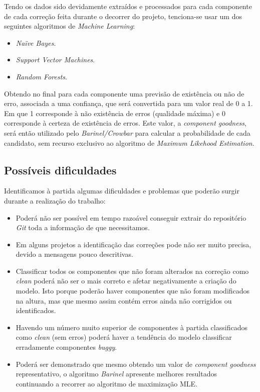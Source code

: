 Tendo os dados sido devidamente extraídos e processados para cada componente de cada correção feita durante o decorrer do projeto, tenciona-se usar um dos seguintes algoritmos de \emph{Machine Learning}:
%
\begin{itemize}
	\item \emph{Naïve Bayes}.
	\item \emph{Support Vector Machines}.
	\item \emph{Random Forests}.
\end{itemize}

Obtendo no final para cada componente uma previsão de existência ou não de erro, associada a uma confiança, que será convertida para um valor real de 0 a 1. Em que 1 corresponde à não existência de erros (qualidade máxima) e 0 corresponde à certeza de existência de erros. Este valor, a \emph{component goodness}, será então utilizado pelo \emph{Barinel/Crowbar} para calcular a probabilidade de cada candidato, sem recurso exclusivo ao algoritmo de \emph{Maximum Likehood Estimation}.


\subsection{Possíveis dificuldades}

Identificamos à partida algumas dificuldades e problemas que poderão surgir durante a realização do trabalho:
%
\begin{itemize}
	\item Poderá não ser possível em tempo razoável conseguir extrair do repositório \emph{Git} toda a informação de que necessitamos.
	\item Em alguns projetos a identificação das correções pode não ser muito precisa, devido a mensagens pouco descritivas.
	\item Classificar todos os componentes que não foram alterados na correção como \emph{clean} poderá não ser o mais correto e afetar negativamente a criação do modelo. Isto porque poderão haver componentes que não foram modificados na altura, mas que mesmo assim contém erros ainda não corrigidos ou identificados.
	\item Havendo um número muito superior de componentes à partida classificados como \emph{clean} (sem erros) poderá haver a tendência do modelo classificar erradamente componentes \emph{buggy}.
	\item Poderá ser demonstrado que mesmo obtendo um valor de \emph{component goodness} representativo, o algoritmo \emph{Barinel} apresente melhores resultados continuando a recorrer ao algoritmo de maximização MLE.
\end{itemize}